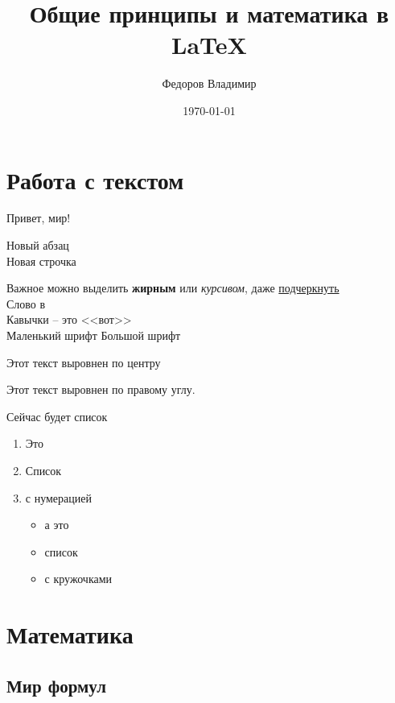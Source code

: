 \documentclass[12pt]{article}
\author{Федоров Владимир}
\title{Общие принципы и математика в \LaTeX{}}
\date{\today}
\begin{document}
\maketitle

{ %
  \hypersetup{linkcolor=blue}
  \tableofcontents
}

\newpage %
\section{Работа с текстом}
Привет, мир!

Новый абзац\\
Новая \hspace{1cm} строчка

Важное можно выделить \textbf{жирным} или \textit{курсивом},
даже \underline{подчеркнуть}\\
Слово в \\
Кавычки -- это <<вот>>\\
{\scriptsize Маленький шрифт} {\Large Большой шрифт}

\begin{center}
Этот текст выровнен по центру
\end{center}

\begin{flushright}
Этот текст выровнен по правому углу.
\end{flushright}

Сейчас будет список

\begin{enumerate} %
\item Это
\item Список
\item с нумерацией
\begin{itemize} %
\item а это
\item список
\item с кружочками
\end{itemize}
\end{enumerate}

\section{Математика}

\subsection{Мир формул} %
\end{document}
